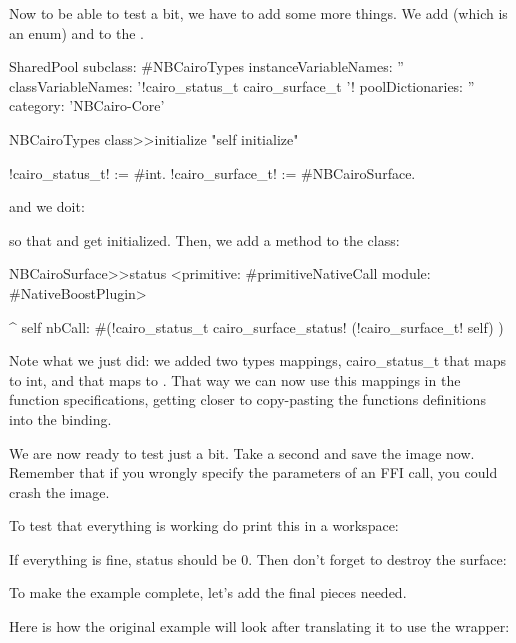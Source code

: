 \documentclass[a4paper,10pt,twoside]{book}
\begin{document}
Now to be able to test a bit, we have to add some more things. We add
 (which is an enum) and  to the
.

   
\begin{classdef}{}
SharedPool subclass: #NBCairoTypes
	instanceVariableNames: ''
	classVariableNames: '!cairo\_status\_t cairo\_surface\_t '!
	poolDictionaries: ''
	category: 'NBCairo-Core'
\end{classdef}

\begin{code}{}
NBCairoTypes class>>initialize
  "self initialize"

  !cairo\_status\_t! := #int.
  !cairo\_surface\_t!  := #NBCairoSurface.
\end{code}

and we doit:


so that  and  get initialized.
Then, we add a method to the  class:

\begin{code}{}
NBCairoSurface>>status
  <primitive: #primitiveNativeCall module: #NativeBoostPlugin>
	
  ^ self nbCall: #(!cairo\_status\_t cairo\_surface\_status! (!cairo\_surface\_t! self) )
\end{code}

Note what we just did: we added two types mappings, cairo\_status\_t
that maps to int, and  that maps to
. That way we can now use this mappings in the
function specifications, getting closer to copy-pasting the functions
definitions into the binding.

We are now ready to test just a bit. Take a second and save the
image now. Remember that if you wrongly specify the parameters
of an FFI call, you could crash the image.

To test that everything is working do print this in a workspace:


If everything is fine, status should be 0. Then don't forget
to destroy the surface:


To make the example complete, let's add the final pieces needed.

Here is how the original example will look after translating
it to use the wrapper:
\end{document}
